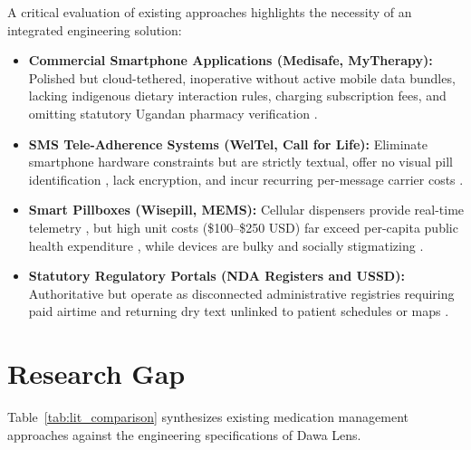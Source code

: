 A critical evaluation of existing approaches highlights the necessity of an integrated engineering solution:
\begin{itemize}[noitemsep,topsep=2pt]
  \item \textbf{Commercial Smartphone Applications (Medisafe, MyTherapy):} Polished but cloud-tethered, inoperative without active mobile data bundles, lacking indigenous dietary interaction rules, charging subscription fees, and omitting statutory Ugandan pharmacy verification \cite{dayer2013smartphone, nda2024register}.
  \item \textbf{SMS Tele-Adherence Systems (WelTel, Call for Life):} Eliminate smartphone hardware constraints \cite{lester2010effects, siedner2021callforlife} but are strictly textual, offer no visual pill identification \cite{parker2016health}, lack encryption, and incur recurring per-message carrier costs \cite{kintu2021development}.
  \item \textbf{Smart Pillboxes (Wisepill, MEMS):} Cellular dispensers provide real-time telemetry \cite{haberer2013realtime}, but high unit costs (\$100--\$250 USD) far exceed per-capita public health expenditure \cite{moh2023performance}, while devices are bulky and socially stigmatizing \cite{ware2009social}.
  \item \textbf{Statutory Regulatory Portals (NDA Registers and USSD):} Authoritative \cite{nda2024register} but operate as disconnected administrative registries requiring paid airtime and returning dry text unlinked to patient schedules or maps \cite{kintu2021development}.
\end{itemize}

\section{Research Gap}

Table~\ref{tab:lit_comparison} synthesizes existing medication management approaches against the engineering specifications of Dawa Lens.

